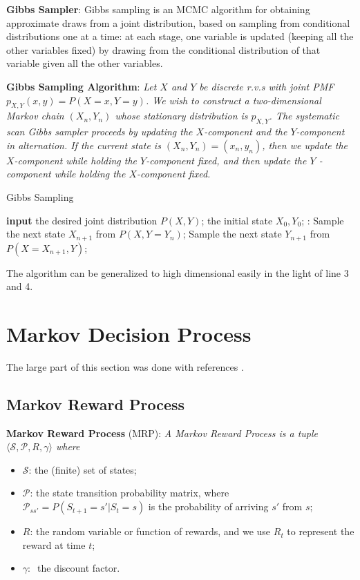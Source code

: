\documentclass{progartcn}
\begin{document}
		\textbf{Gibbs Sampler}: Gibbs sampling is an MCMC algorithm for obtaining approximate draws from a joint distribution, based on sampling from conditional distributions one at a time: at each stage, one variable is updated (keeping all the other variables fixed) by drawing from the conditional distribution of that variable given all the other variables.

		\textbf{Gibbs Sampling Algorithm}: \textit{Let $X$ and $Y$ be discrete r.v.s with joint PMF $p_{X,Y} (x,y) = P(X = x,Y = y)$. We wish to construct a two-dimensional Markov chain $(X_n, Y_n)$ whose stationary distribution is $p_{X,Y}$. The systematic scan Gibbs sampler proceeds by updating the $X$-component and the $Y$-component in alternation. If the current state is $(X_n,Y_n) = (x_n,y_n)$, then we update the $X$-component while holding the $Y$-component fixed, and then update the $Y$ -component while holding the $X$-component fixed.}

		\begin{algorithm}[H]
		\caption{Gibbs Sampling}
		\label{alg: Gibbs Sampling}
		\begin{algorithmic}[1]
			\State \textbf{input} the desired joint distribution $P(X,Y)$; the initial state $X_0, Y_0$;
			:
				\State Sample the next state $X_{n+1}$ from $P(X, Y=Y_n)$;
            	\State Sample the next state $Y_{n+1}$ from $P(X=X_{n+1}, Y)$;
        	\EndFor
		\end{algorithmic}
		\end{algorithm}

        The algorithm can be generalized to high dimensional easily in the light of line 3 and 4.

\pagebreak

\section{Markov Decision Process}

	The large part of this section was done with references \cite{si252,introRL,ucl_rl,sutton2018reinforcement}.\\

	\subsection{Markov Reward Process}

		\textbf{Markov Reward Process} (MRP): \textit{A Markov Reward Process is a tuple $\langle \mathcal{S,P}, R,\gamma\rangle$ where}
		\begin{itemize}[noitemsep,topsep=0pt]
			\item$\mathcal{S}$: the (finite) set of states;
			\item$\mathcal{P}$: the state transition probability matrix, where $\mathcal{P}_{ss'}=P(S_{t+1}=s'|S_t=s)$ is the probability of arriving $s'$ from $s$;
			\item$R$: the random variable or function of rewards, and we use $R_t$ to represent the reward at time $t$;
			\item$\gamma:\ $ the discount factor.
		\end{itemize}
\end{document}
